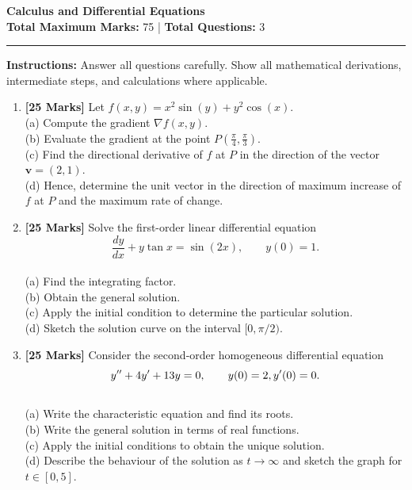 \documentclass[11pt,a4paper]{article}
\begin{document}
\begin{center}
    {\LARGE \textbf{ Calculus and Differential Equations }} \\[0.5em]
    \textbf{Total Maximum Marks:} 75 \quad | \quad \textbf{Total Questions:} 3
\end{center}

\vspace{1em}
\hrule
\vspace{1.5em}

\noindent \textbf{Instructions:} Answer all questions carefully. Show all mathematical derivations, intermediate steps, and calculations where applicable.

\vspace{1.5em}

\begin{enumerate}[label=\textbf{Q\arabic*.}, leftmargin=2em]

    \item \textbf{[25 Marks]} Let $f(x,y) = x^2 \sin(y) + y^2 \cos(x)$. \\ (a) Compute the gradient $\nabla f(x,y)$. \\ (b) Evaluate the gradient at the point $P\left(\frac{\pi}{4},\frac{\pi}{3}\right)$. \\ (c) Find the directional derivative of $f$ at $P$ in the direction of the vector $\mathbf{v} = (2,1)$. \\ (d) Hence, determine the unit vector in the direction of maximum increase of $f$ at $P$ and the maximum rate of change.
    
    \vspace{1em}

    \item \textbf{[25 Marks]} Solve the first-order linear differential equation \\ $$ \frac{dy}{dx} + y \tan x = \sin(2x), \qquad y(0)=1. $$ \\ (a) Find the integrating factor. \\ (b) Obtain the general solution. \\ (c) Apply the initial condition to determine the particular solution. \\ (d) Sketch the solution curve on the interval $[0,\pi/2)$.
    
    \vspace{1em}

    \item \textbf{[25 Marks]} Consider the second‑order homogeneous differential equation \\ $$ y'' + 4y' + 13y = 0, \qquad y(0)=2,\\ y'(0)=0. $$ \\ (a) Write the characteristic equation and find its roots. \\ (b) Write the general solution in terms of real functions. \\ (c) Apply the initial conditions to obtain the unique solution. \\ (d) Describe the behaviour of the solution as $t\to\infty$ and sketch the graph for $t\in[0,5]$.
    
    \vspace{1em}

\end{enumerate}
\end{document}
